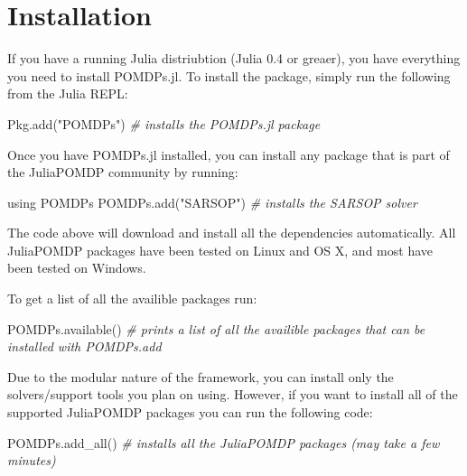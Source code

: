\documentclass[12pt,]{article}
\newenvironment{Shaded}{}{}
\newcommand{\StringTok}[1]{\textcolor[rgb]{0.25,0.44,0.63}{{#1}}}
\newcommand{\CommentTok}[1]{\textcolor[rgb]{0.38,0.63,0.69}{\textit{{#1}}}}
\newcommand{\NormalTok}[1]{{#1}}
\begin{document}
\section{Installation}\label{installation}

If you have a running Julia distriubtion (Julia 0.4 or greaer), you have
everything you need to install POMDPs.jl. To install the package, simply
run the following from the Julia REPL:

\begin{Shaded}
\begin{Highlighting}[]
\NormalTok{Pkg.add(}\StringTok{"POMDPs"}\NormalTok{) }\CommentTok{# installs the POMDPs.jl package}
\end{Highlighting}
\end{Shaded}

Once you have POMDPs.jl installed, you can install any package that is
part of the JuliaPOMDP community by running:

\begin{Shaded}
\begin{Highlighting}[]
\NormalTok{using POMDPs}
\NormalTok{POMDPs.add(}\StringTok{"SARSOP"}\NormalTok{) }\CommentTok{# installs the SARSOP solver}
\end{Highlighting}
\end{Shaded}

The code above will download and install all the dependencies
automatically. All JuliaPOMDP packages have been tested on Linux and OS
X, and most have been tested on Windows.

To get a list of all the availible packages run:

\begin{Shaded}
\begin{Highlighting}[]
\NormalTok{POMDPs.available() }\CommentTok{# prints a list of all the availible packages that can be installed with POMDPs.add}
\end{Highlighting}
\end{Shaded}

Due to the modular nature of the framework, you can install only the
solvers/support tools you plan on using. However, if you want to install
all of the supported JuliaPOMDP packages you can run the following code:

\begin{Shaded}
\begin{Highlighting}[]
\NormalTok{POMDPs.add_all() }\CommentTok{# installs all the JuliaPOMDP packages (may take a few minutes)}
\end{Highlighting}
\end{Shaded}
\end{document}
